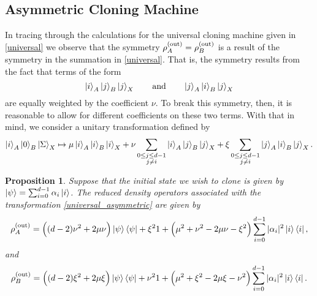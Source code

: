 \documentclass[reqno]{amsart}
\newtheorem{proposition}{Proposition}
\numberwithin{lemma}{section}
\numberwithin{proposition}{section}
\newcommand{\out}{\textnormal{out}}
\begin{document}
{\subsection{Asymmetric Cloning Machine}
In tracing through the calculations for the universal cloning machine given in \eqref{universal} we observe that the symmetry $\rho_{A}^{(\out)} = \rho_{B}^{(\out)}$ is a result of the symmetry in the summation in \eqref{universal}. That is, the symmetry results from the fact that terms of the form
\begin{equation*}
\ket{i}_{A} \ket{j}_{B} \ket{j}_{X} \qquad \text{and} \qquad 
\ket{j}_{A} \ket{i}_{B} \ket{j}_{X}
\end{equation*}
are equally weighted by the coefficient $\nu$. To break this symmetry, then, it is reasonable to allow for different coefficients on these two terms. With that in mind, we consider a unitary transformation defined by
\begin{equation}
\label{universal_asymmetric}
\ket{i}_{A} \ket{0}_{B} \ket{\Sigma}_{X} \mapsto \mu \ket{i}_{A} \ket{i}_{B} \ket{i}_{X} + \nu \sum_{\substack{0 \leq j \leq d-1\\ j \neq i}} \ket{i}_{A} \ket{j}_{B} \ket{j}_{X} + \xi \sum_{\substack{0 \leq j \leq d-1\\ j \neq i}} \ket{j}_{A} \ket{i}_{B} \ket{j}_{X}.
\end{equation}

\begin{proposition}
\label{asym_density_ops}
Suppose that the initial state we wish to clone is given by $\ket{\psi} = \sum_{i=0}^{d-1} \alpha_{i} \ket{i}$. The reduced density operators associated with the transformation \eqref{universal_asymmetric} are given by
\begin{equation*}
\rho_{A}^{(\out)} = \Big ( (d-2)\nu^{2} + 2\mu \nu \Big ) \ket{\psi}  \bra{\psi} + \xi^{2} 1 + \Big ( \mu^{2} + \nu^{2} - 2\mu \nu - \xi^{2} \Big ) \sum_{i=0}^{d-1} \vert \alpha_{i} \vert^{2} \ket{i} \bra{i},
\end{equation*}
and
\begin{equation*}
\rho_{B}^{(\out)} = \Big ( (d-2)\xi^{2} + 2\mu \xi \Big ) \ket{\psi}  \bra{\psi} + \nu^{2} 1 + \Big ( \mu^{2} + \xi^{2} - 2\mu \xi - \nu^{2} \Big ) \sum_{i=0}^{d-1} \vert \alpha_{i} \vert^{2} \ket{i} \bra{i}.
\end{equation*}
\end{proposition}

}
\end{document}

